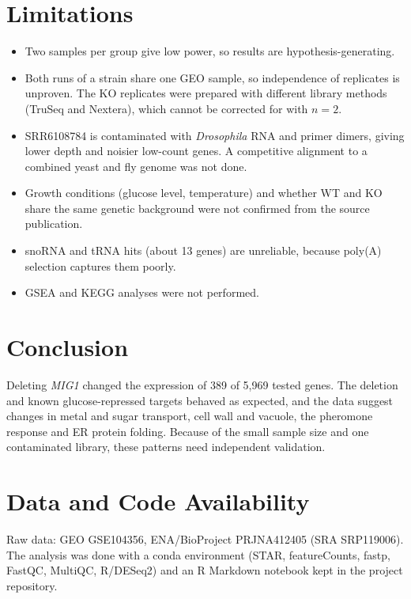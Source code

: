 \documentclass[11pt, a4paper]{article}
\begin{document}
\section{Limitations}
\begin{itemize}
  \item Two samples per group give low power, so results are hypothesis-generating.
  \item Both runs of a strain share one GEO sample, so independence of replicates is unproven. The KO replicates were prepared with different library methods (TruSeq and Nextera), which cannot be corrected for with $n=2$.
  \item SRR6108784 is contaminated with \textit{Drosophila} RNA and primer dimers, giving lower depth and noisier low-count genes. A competitive alignment to a combined yeast and fly genome was not done.
  \item Growth conditions (glucose level, temperature) and whether WT and KO share the same genetic background were not confirmed from the source publication.
  \item snoRNA and tRNA hits (about 13 genes) are unreliable, because poly(A) selection captures them poorly.
  \item GSEA and KEGG analyses were not performed.
\end{itemize}

\section{Conclusion}
Deleting \textit{MIG1} changed the expression of 389 of 5,969 tested genes. The deletion and known glucose-repressed targets behaved as expected, and the data suggest changes in metal and sugar transport, cell wall and vacuole, the pheromone response and ER protein folding. Because of the small sample size and one contaminated library, these patterns need independent validation.

\section*{Data and Code Availability}
Raw data: GEO GSE104356, ENA/BioProject PRJNA412405 (SRA SRP119006). The analysis was done with a conda environment (STAR, featureCounts, fastp, FastQC, MultiQC, R/DESeq2) and an R Markdown notebook kept in the project repository.
\end{document}
